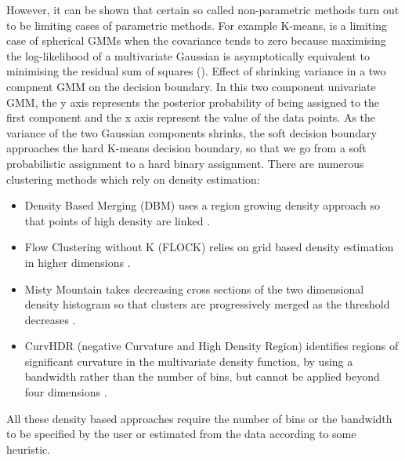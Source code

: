 However, it can be shown that certain so called non-parametric methods turn out to be limiting cases of parametric methods.
For example K-means, is a limiting case of spherical \glspl{GMM} when the covariance tends to zero
because maximising the log-likelihood of a multivariate Gaussian is asymptotically equivalent to minimising the residual sum of squares ().
{ Effect of shrinking variance in a two compnent \gls{GMM} on the decision boundary. }
{
  In this two component univariate \gls{GMM}, the y axis represents the posterior probability of being assigned to the first component and
  the x axis represent the value of the data points.
  As the variance of the two Gaussian components shrinks, the soft decision boundary approaches the hard K-means decision boundary, so that we go from
  a soft probabilistic assignment to a hard binary assignment. 
}
There are numerous clustering methods which rely on density estimation:
\begin{itemize}
  \item Density Based Merging (DBM) uses a region growing density approach so that points of high density are linked \citep{Walther:2009gn}.
  \item Flow Clustering without K (FLOCK) relies on grid based density estimation in higher dimensions \citep{Qian:2010ep}.
  \item Misty Mountain takes decreasing cross sections of the two dimensional density histogram so that clusters are progressively merged as the threshold decreases \citep{Sugar:2010jf}.
  \item CurvHDR (negative Curvature and High Density Region) identifies regions of significant curvature in the multivariate density function,
by using a bandwidth rather than the number of bins, but cannot be applied beyond four dimensions \citep{Naumann:2010fp}.
\end{itemize}
All these density based approaches require the number of bins or the bandwidth to be specified by the user or estimated from the data according to some heuristic.
